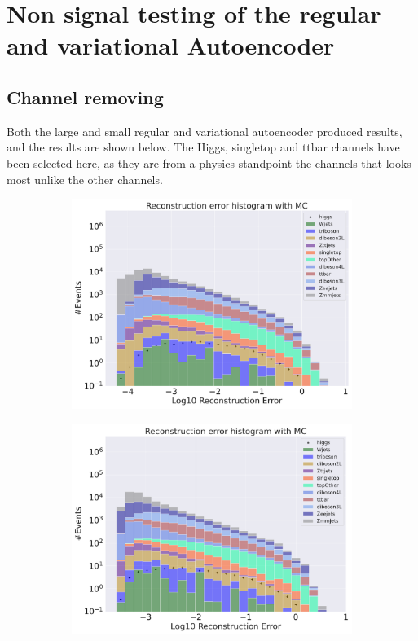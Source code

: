 \section{Non signal testing of the regular and variational Autoencoder}\label{sec:nonsig}

\subsection*{Channel removing}

Both the large and small regular and variational autoencoder produced results, and the results are shown below. 
The Higgs, singletop and ttbar channels have been selected here, as they are 
from a physics standpoint the channels that looks most unlike the other channels.  


\begin{figure}[H]
    \centering
    \begin{subfigure}{.45\textwidth}
        \includegraphics[width=\textwidth]{Figures/AE_testing/small/b_data_recon_big_rm3_feats_sig_higgs.pdf}
        \caption{}
        \label{fig:ae_small_higgs}
    \end{subfigure}
    \hfill 
    \begin{subfigure}{.45\textwidth}
        \includegraphics[width=\textwidth]{Figures/AE_testing/big/b_data_recon_big_rm3_feats_sig_higgs.pdf}

\end{subfigure}
\end{figure}
